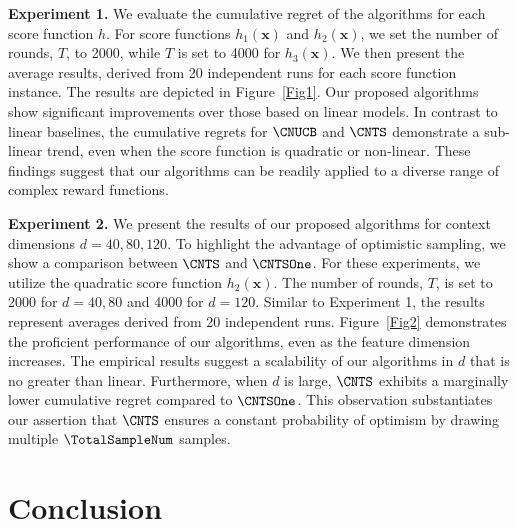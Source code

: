 \documentclass{article}
\theoremstyle{plain}
\begin{document}
\noindent \textbf{Experiment 1.}
We evaluate the cumulative regret of the algorithms for each score function $h$. For score functions $h_{1}(\mathbf{x})$ and $h_{2}(\mathbf{x})$, we set the number of rounds, $T$, to 2000, while $T$ is set to 4000 for $h_{3}(\mathbf{x})$. We then present the average results, derived from 20 independent runs for each score function instance.
The results are depicted in Figure~\ref{Fig1}. 
Our proposed algorithms show significant improvements over those based on linear models. 
In contrast to linear baselines, the cumulative regrets for $\CNUCB$ and $\CNTS$ demonstrate a sub-linear trend, even when the score function is quadratic or non-linear. 
These findings suggest that our algorithms can be readily applied to a diverse range of complex reward functions.




\noindent \textbf{Experiment 2.}
We present the results of our proposed algorithms for context dimensions $d={40,80,120}$. 
To highlight the advantage of optimistic sampling, we show a comparison between $\CNTS$ and $\CNTSOne$. 
For these experiments, we utilize the quadratic score function $h_{2}(\mathbf{x})$. 
The number of rounds, $T$, is set to 2000 for $d=40, 80$ and 4000 for $d=120$. 
Similar to Experiment 1, the results represent averages derived from 20 independent runs.
Figure~\ref{Fig2} demonstrates the proficient performance of our algorithms, even as the feature dimension increases. 
The empirical results suggest a scalability of our algorithms in $d$ that is no greater than linear. Furthermore, when $d$ is large, $\CNTS$ exhibits a marginally lower cumulative regret compared to $\CNTSOne$. 
This observation substantiates our assertion that $\CNTS$ ensures a constant probability of optimism by drawing multiple $\TotalSampleNum$ samples.



\section{Conclusion}
\end{document}
